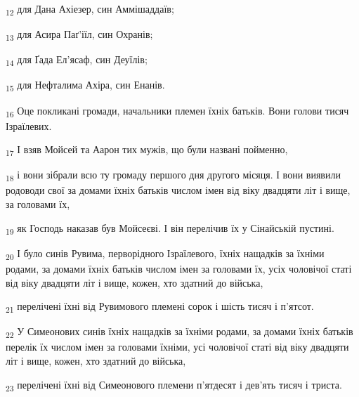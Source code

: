 \begin{tcolorbox}
\textsubscript{12} для Дана Ахіезер, син Аммішаддаїв;
\end{tcolorbox}
\begin{tcolorbox}
\textsubscript{13} для Асира Паґ'іїл, син Охранів;
\end{tcolorbox}
\begin{tcolorbox}
\textsubscript{14} для Ґада Ел'ясаф, син Деуїлів;
\end{tcolorbox}
\begin{tcolorbox}
\textsubscript{15} для Нефталима Ахіра, син Енанів.
\end{tcolorbox}
\begin{tcolorbox}
\textsubscript{16} Оце покликані громади, начальники племен їхніх батьків. Вони голови тисяч Ізраїлевих.
\end{tcolorbox}
\begin{tcolorbox}
\textsubscript{17} І взяв Мойсей та Аарон тих мужів, що були названі пойменно,
\end{tcolorbox}
\begin{tcolorbox}
\textsubscript{18} і вони зібрали всю ту громаду першого дня другого місяця. І вони виявили родоводи свої за домами їхніх батьків числом імен від віку двадцяти літ і вище, за головами їх,
\end{tcolorbox}
\begin{tcolorbox}
\textsubscript{19} як Господь наказав був Мойсеєві. І він перелічив їх у Сінайській пустині.
\end{tcolorbox}
\begin{tcolorbox}
\textsubscript{20} І було синів Рувима, перворідного Ізраїлевого, їхніх нащадків за їхніми родами, за домами їхніх батьків числом імен за головами їх, усіх чоловічої статі від віку двадцяти літ і вище, кожен, хто здатний до війська,
\end{tcolorbox}
\begin{tcolorbox}
\textsubscript{21} перелічені їхні від Рувимового племені сорок і шість тисяч і п'ятсот.
\end{tcolorbox}
\begin{tcolorbox}
\textsubscript{22} У Симеонових синів їхніх нащадків за їхніми родами, за домами їхніх батьків перелік їх числом імен за головами їхніми, усі чоловічої статі від віку двадцяти літ і вище, кожен, хто здатний до війська,
\end{tcolorbox}
\begin{tcolorbox}
\textsubscript{23} перелічені їхні від Симеонового племени п'ятдесят і дев'ять тисяч і триста.
\end{tcolorbox}
